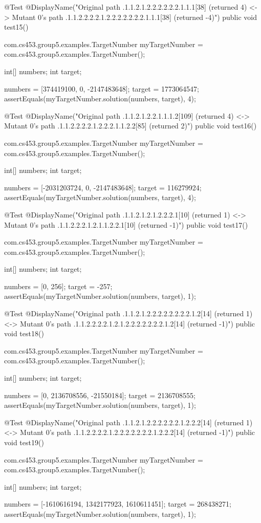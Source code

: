 @Test
@DisplayName("Original path .1.1.2.1.2.2.2.2.2.2.1.1.1[38] (returned 4) <-> Mutant 0's path .1.1.2.2.2.2.1.2.2.2.2.2.2.2.1.1.1[38] (returned -4)")
public void test15() {
    com.cs453.group5.examples.TargetNumber myTargetNumber = com.cs453.group5.examples.TargetNumber();

    int[] numbers;
    int target;

    numbers = [374419100, 0, -2147483648];
    target = 1773064547;
    assertEquals(myTargetNumber.solution(numbers, target), 4);
}

@Test
@DisplayName("Original path .1.1.2.1.2.2.1.1.1.2[109] (returned 4) <-> Mutant 0's path .1.1.2.2.2.2.1.2.2.2.1.1.2.2[85] (returned 2)")
public void test16() {
    com.cs453.group5.examples.TargetNumber myTargetNumber = com.cs453.group5.examples.TargetNumber();

    int[] numbers;
    int target;

    numbers = [-2031203724, 0, -2147483648];
    target = 116279924;
    assertEquals(myTargetNumber.solution(numbers, target), 4);
}

@Test
@DisplayName("Original path .1.1.2.1.2.1.2.2.2.1[10] (returned 1) <-> Mutant 0's path .1.1.2.2.2.1.2.1.1.2.2.1[10] (returned -1)")
public void test17() {
    com.cs453.group5.examples.TargetNumber myTargetNumber = com.cs453.group5.examples.TargetNumber();

    int[] numbers;
    int target;

    numbers = [0, 256];
    target = -257;
    assertEquals(myTargetNumber.solution(numbers, target), 1);
}

@Test
@DisplayName("Original path .1.1.2.1.2.2.2.2.2.2.2.2.1.2[14] (returned 1) <-> Mutant 0's path .1.1.2.2.2.2.1.2.1.2.2.2.2.2.2.2.1.2[14] (returned -1)")
public void test18() {
    com.cs453.group5.examples.TargetNumber myTargetNumber = com.cs453.group5.examples.TargetNumber();

    int[] numbers;
    int target;

    numbers = [0, 2136708556, -21550184];
    target = 2136708555;
    assertEquals(myTargetNumber.solution(numbers, target), 1);
}

@Test
@DisplayName("Original path .1.1.2.1.2.2.2.2.2.2.1.2.2.2[14] (returned 1) <-> Mutant 0's path .1.1.2.2.2.2.1.2.2.2.2.2.2.2.1.2.2.2[14] (returned -1)")
public void test19() {
    com.cs453.group5.examples.TargetNumber myTargetNumber = com.cs453.group5.examples.TargetNumber();

    int[] numbers;
    int target;

    numbers = [-1610616194, 1342177923, 1610611451];
    target = 268438271;
    assertEquals(myTargetNumber.solution(numbers, target), 1);
}

